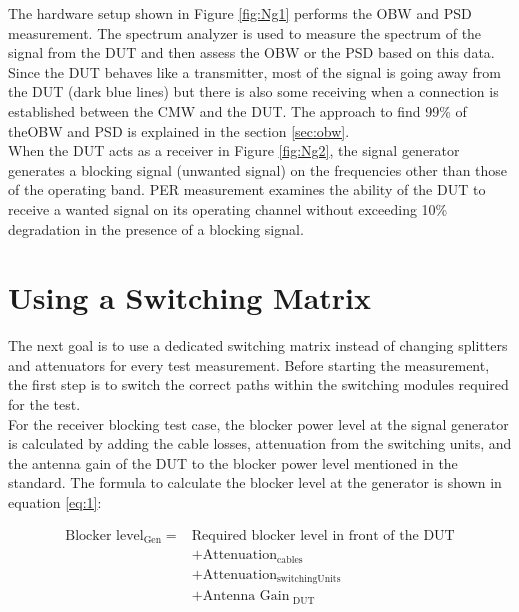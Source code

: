 The hardware setup shown in Figure \ref{fig:Ng1} performs the \acf{OBW} and \acf{PSD} measurement. The spectrum analyzer is used to measure the spectrum of the signal from the \acs{DUT} and then assess the \acf{OBW} or the \acf{PSD} based on this data. Since the \acs{DUT} behaves like a transmitter, most of the signal is going away from the \acs{DUT} (dark blue lines) but there is also some receiving when a connection is established between the \acf{CMW} and the \acs{DUT}. The approach to find 99\% of the\acf{OBW} and \acf{PSD} is explained in the section \ref{sec:obw}.\\

When the \acs{DUT} acts as a receiver in Figure \ref{fig:Ng2}, the signal generator generates a blocking signal (unwanted signal) on the frequencies other than those of the operating band.  \acf{PER} measurement examines the ability of the \acs{DUT} to receive a wanted signal on its operating channel without exceeding 10\% degradation in the presence of a blocking signal. 

\section{Using a Switching Matrix}
\label{sec:switch}
The next goal is to use a dedicated switching matrix instead of changing splitters and attenuators for every test measurement. Before starting the measurement, the first step is to switch the correct paths within the switching modules required for the test. \\

For the receiver blocking test case, the blocker power level at the signal generator is calculated by adding the cable losses, attenuation from the switching units, and the antenna gain of the \acs{DUT} to the blocker power level mentioned in the standard. The formula to calculate the blocker level at the generator is shown in equation \ref{eq:1}:

\begin{equation}
\begin{aligned}
\mbox{Blocker level}_ {\mbox{Gen}} = &\mbox{Required blocker level in front of the DUT} \\
&+ \mbox{Attenuation}_{\mbox{cables}} \\
&+ \mbox{Attenuation}_{\mbox{switchingUnits}}  \\
&+ \mbox{Antenna Gain}_{\mbox{ DUT}}
\label{eq:1}
\end{aligned}
\end{equation}

